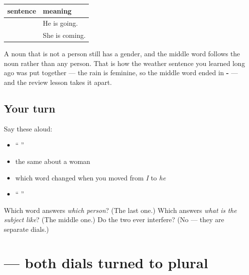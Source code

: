\begin{grammarlens}[title={Grammar Lens: it works on things as well as people}]
\noindent
\begin{tabularx}{\linewidth}{@{}>{\raggedright\arraybackslash}X>{\raggedright\arraybackslash}X@{}}
\toprule
\textbf{sentence} & \textbf{meaning} \\
\midrule
\hi{वह} \hi{जा} \hi{रहा} \hi{है।} & He is going. \\
\hi{वह} \hi{आ} \hi{रही} \hi{है।} & She is coming. \\
\bottomrule
\end{tabularx}

A noun that is not a person still has a gender, and the middle word follows the noun rather than any person. That is how the weather sentence you learned long ago was put together — the rain is feminine, so the middle word ended in \textbf{-} — and the review lesson takes it apart.
\end{grammarlens}

\subsection*{Your turn}
Say these aloud:

\begin{itemize}
\raggedright
  \item \textquotedblleft{}   \textquotedblright{}
  \item the same about a woman
  \item which word changed when you moved from \emph{I} to \emph{he}
  \item \textquotedblleft{}   \textquotedblright{}
\end{itemize}

\begin{tcolorbox}[breakable,colback=teal!4,colframe=teal!35!black,title={Before you move on}]
Which word answers \emph{which person}? (The last one.) Which answers \emph{what is the subject like}? (The middle one.) Do the two ever interfere? (No — they are separate dials.)
\end{tcolorbox}
\section[\texorpdfstring{\hi{कर} \hi{रहे} \hi{हैं} (kar rahe haiṁ)}{कर रहे हैं (kar rahe haiṁ)}]{   — both dials turned to plural}

\label{lesson:HI-C89-kar-rahe-hain}



